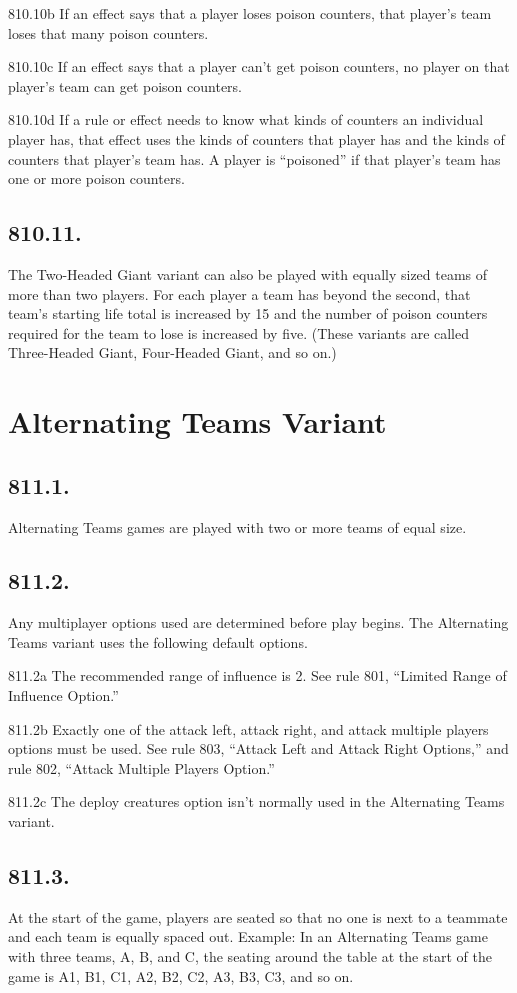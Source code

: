 810.10b If an effect says that a player loses poison counters, that player’s team loses that many poison counters.

810.10c If an effect says that a player can’t get poison counters, no player on that player’s team can get poison counters.

810.10d If a rule or effect needs to know what kinds of counters an individual player has, that effect uses the kinds of counters that player has and the kinds of counters that player’s team has. A player is “poisoned” if that player’s team has one or more poison counters.

\subsection*{810.11.}
The Two-Headed Giant variant can also be played with equally sized teams of more than two players. For each player a team has beyond the second, that team’s starting life total is increased by 15 and the number of poison counters required for the team to lose is increased by five. (These variants are called Three-Headed Giant, Four-Headed Giant, and so on.)

\section{Alternating Teams Variant}
\subsection*{811.1.}
Alternating Teams games are played with two or more teams of equal size.

\subsection*{811.2.}
Any multiplayer options used are determined before play begins. The Alternating Teams variant uses the following default options.

811.2a The recommended range of influence is 2. See rule 801, “Limited Range of Influence Option.”

811.2b Exactly one of the attack left, attack right, and attack multiple players options must be used. See rule 803, “Attack Left and Attack Right Options,” and rule 802, “Attack Multiple Players Option.”

811.2c The deploy creatures option isn’t normally used in the Alternating Teams variant.

\subsection*{811.3.}
At the start of the game, players are seated so that no one is next to a teammate and each team is equally spaced out.
Example: In an Alternating Teams game with three teams, A, B, and C, the seating around the table at the start of the game is A1, B1, C1, A2, B2, C2, A3, B3, C3, and so on.

